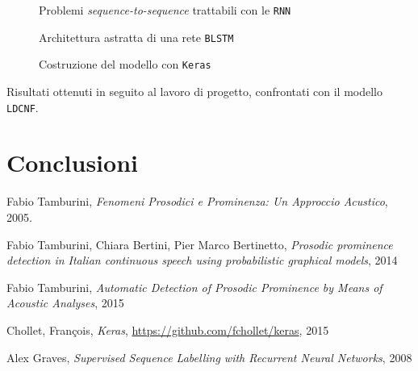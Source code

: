 \documentclass[twoside,twocolumn,10pt]{extarticle}
\theoremstyle{definition}
\begin{document}
	\begin{figure*}[h]
		\centering
		\caption{Problemi \textit{sequence-to-sequence} trattabili con le \texttt{RNN}}
		\label{fig:seqs}
	\end{figure*}
	\begin{figure}
		\centering
		\caption{Architettura astratta di una rete \texttt{BLSTM}}
		\label{fig:blstm}
	\end{figure}
	\begin{figure*}[ht!]
		\centering
		\caption{Costruzione del modello con \texttt{Keras}}
		\label{fig:modelcode}
	\end{figure*}
	\begin{table*}[]
		\centering
		\caption{Risultati ottenuti in seguito al lavoro di progetto, confrontati con il modello \texttt{LDCNF}.}
		\label{tab:results}
		
	\end{table*}
	
	\section{Conclusioni}	
	
\begin{thebibliography}{99}	
		Fabio Tamburini,
		\newblock \emph{Fenomeni Prosodici e Prominenza: Un Approccio Acustico},
		2005.

		Fabio Tamburini, Chiara Bertini, Pier Marco Bertinetto,
		\newblock \emph{Prosodic prominence detection in Italian continuous speech using probabilistic graphical models},
		2014

		Fabio Tamburini,
		\newblock \emph{Automatic Detection of Prosodic Prominence by Means of Acoustic Analyses},
		2015

		Chollet, Fran\c{c}ois,
		\newblock \emph{Keras},
		\url{https://github.com/fchollet/keras},
		2015

		Alex Graves,
		\newblock \emph{Supervised Sequence Labelling with Recurrent Neural Networks},
		2008
\end{thebibliography}
\end{document}
